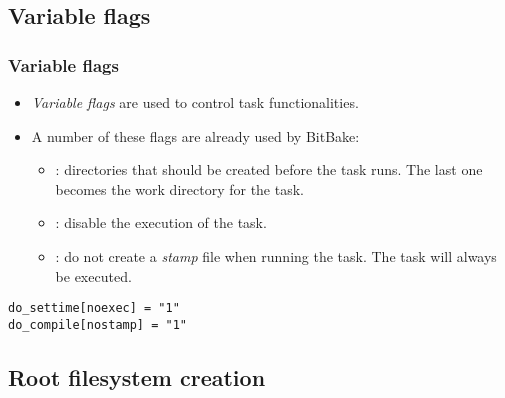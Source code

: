 \subsection{Variable flags}

\begin{frame}[fragile]
  \frametitle{Variable flags}
  \begin{itemize}
    \item {\em Variable flags} are used to control task
      functionalities.
    \item A number of these flags are already used by BitBake:
      \begin{itemize}
        \item {}: directories that should be created before the
          task runs. The last one becomes the work directory for the
          task.
        \item {}: disable the execution of the task.
        \item {}: do not create a {\em stamp} file when
          running the task. The task will always be executed.
      \end{itemize}
  \end{itemize}
  \begin{verbatim}
do_settime[noexec] = "1"
do_compile[nostamp] = "1"
  \end{verbatim}
\end{frame}

\subsection{Root filesystem creation}

